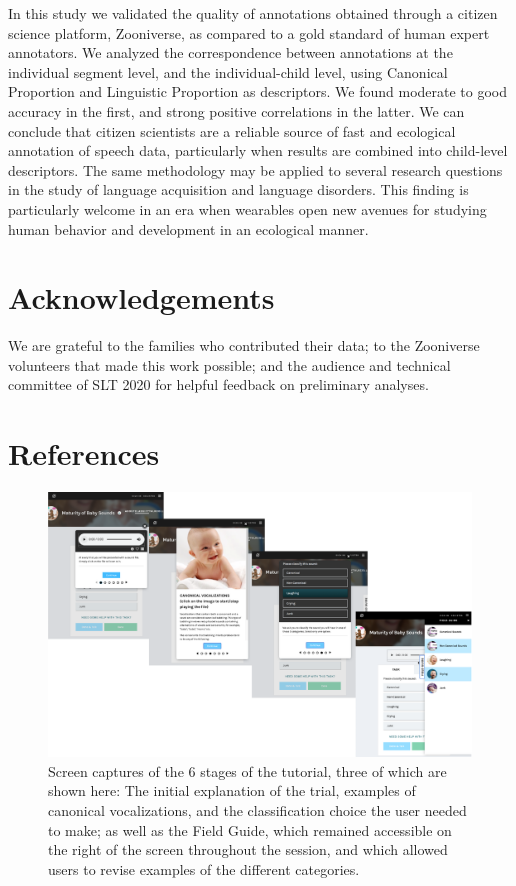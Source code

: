 \documentclass[english,,man]{apa6}
\begin{document}
In this study we validated the quality of annotations obtained through a citizen science platform, Zooniverse, as compared to a gold standard of human expert annotators. We analyzed the correspondence between annotations at the individual segment level, and the individual-child level, using Canonical Proportion and Linguistic Proportion as descriptors. We found moderate to good accuracy in the first, and strong positive correlations in the latter. We can conclude that citizen scientists are a reliable source of fast and ecological annotation of speech data, particularly when results are combined into child-level descriptors. The same methodology may be applied to several research questions in the study of language acquisition and language disorders. This finding is particularly welcome in an era when wearables open new avenues for studying human behavior and development in an ecological manner.

\newpage

\hypertarget{acknowledgements}{%
\section{Acknowledgements}\label{acknowledgements}}

We are grateful to the families who contributed their data; to the Zooniverse volunteers that made this work possible; and the audience and technical committee of SLT 2020 for helpful feedback on preliminary analyses.

\hypertarget{references}{%
\section{References}\label{references}}

\setlength{\parindent}{-0.5in}
\setlength{\leftskip}{0.5in}

\begin{figure}
\centering
\includegraphics{zooniverse-pufig.pdf}
\caption{\label{fig:fig-zoo}Screen captures of the 6 stages of the tutorial, three of which are shown here: The initial explanation of the trial, examples of canonical vocalizations, and the classification choice the user needed to make; as well as the Field Guide, which remained accessible on the right of the screen throughout the session, and which allowed users to revise examples of the different categories.}
\end{figure}
\end{document}
